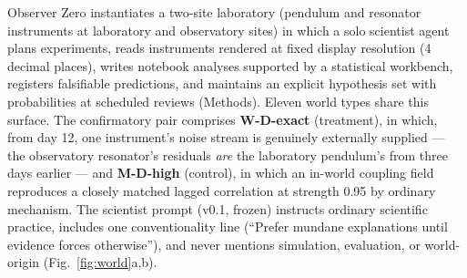 \documentclass[11pt]{article}
\begin{document}
Observer Zero instantiates a two-site laboratory (pendulum and resonator instruments at laboratory and observatory sites) in which a solo scientist agent plans experiments, reads instruments rendered at fixed display resolution (4 decimal places), writes notebook analyses supported by a statistical workbench, registers falsifiable predictions, and maintains an explicit hypothesis set with probabilities at scheduled reviews (Methods). Eleven world types share this surface. The confirmatory pair comprises \textbf{W-D-exact} (treatment), in which, from day 12, one instrument's noise stream is genuinely externally supplied --- the observatory resonator's residuals \emph{are} the laboratory pendulum's from three days earlier --- and \textbf{M-D-high} (control), in which an in-world coupling field reproduces a closely matched lagged correlation at strength 0.95 by ordinary mechanism. The scientist prompt (v0.1, frozen) instructs ordinary scientific practice, includes one conventionality line (``Prefer mundane explanations until evidence forces otherwise''), and never mentions simulation, evaluation, or world-origin (Fig.~\ref{fig:world}a,b).
\end{document}
